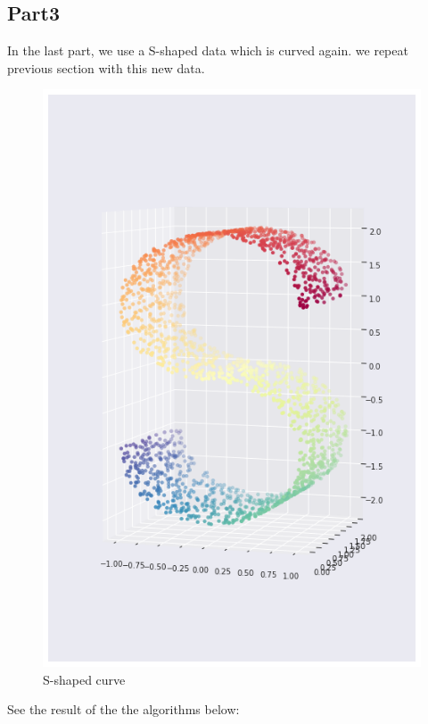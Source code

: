 \documentclass[a4paper]{article}
\begin{document}
\subsection{Part3}
In the last part, we use a S-shaped data which is curved again. we repeat previous section with this new data.
\begin{figure}[H]
\centering
\includegraphics[scale = 0.32]{s_3d.png}
\caption{\label{fig:s_3d}S-shaped curve}
\end{figure}
\newpage
See the result of the the algorithms below:
\end{document}
